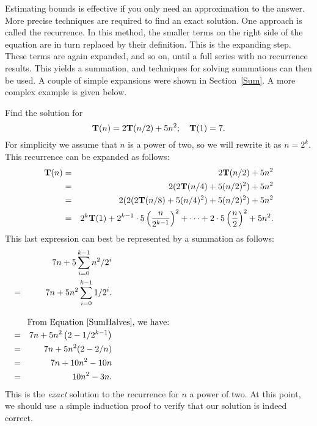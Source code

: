 Estimating bounds is effective if you only need an approximation to
the answer.
More precise techniques are required to find an exact solution.
One approach is called  the recurrence.
In this method, the smaller terms on the right side of the equation
are in turn replaced by their definition.
This is the expanding step.
These terms are again expanded, and so on, until a full series
with no recurrence results.
This yields a summation, and techniques for solving summations can
then be used.
A couple of simple expansions were shown in Section~\ref{Sum}.
A more complex example is given below.

\begin{example}
Find the solution for
\[{\bf T}(n) = 2{\bf T}(n/2) + 5 n^2; \quad {\bf T}(1) = 7.\]
\noindent For simplicity we assume that \(n\) is a power of two,
so we will rewrite it as \(n = 2^k\).
This recurrence can be expanded as follows:
\begin{eqnarray*}
{\bf T}(n) & = & 2{\bf T}(n/2) + 5n^2\\
     & = & 2(2{\bf T}(n/4) + 5(n/2)^2) + 5n^2\\
     & = & 2(2(2{\bf T}(n/8) + 5(n/4)^2) + 5(n/2)^2) + 5n^2\\
     & = & 2^k{\bf T}(1) + 2^{k-1}\cdot5\left (\frac{n}{2^{k-1}}\right )^2
                         + \cdots + 2\cdot5\left (\frac{n}{2}\right )^2
                         + 5n^2.
\end{eqnarray*}
\noindent This last expression can best be represented by a summation
as follows:
\begin{eqnarray*}
&   & 7n + 5\sum_{i=0}^{k-1} n^2/2^i\\
& = & 7n + 5n^2\sum_{i=0}^{k-1} 1/2^i.\\
\noalign{\hspace{\parskip}
\hbox{\rule{0in}{1.5pc}From Equation~\ref{SumHalves}, we have:}}
& = & 7n + 5n^2\left (2 - 1/2^{k-1}\right )\\
& = & 7n + 5n^2(2 - 2/n)\\
& = & 7n + 10 n^2 - 10n\\
& = & 10n^2 - 3n.
\end{eqnarray*}
\noindent This is the \emph{exact} solution to the recurrence for \(n\)
a power of two.
At this point, we should use a simple induction proof to verify that
our solution is indeed correct.
\end{example}

